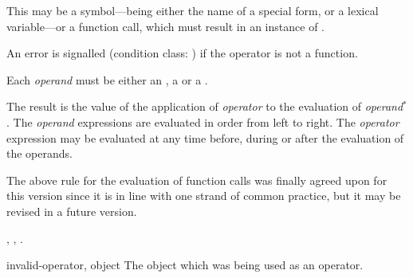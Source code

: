 \begin{optDefinition}
%
\Syntax
{}%
%
\begin{arguments}
    \item[\scref{operator}] This may be a symbol---being either the name of a
    special form, or a lexical variable---or a function call, which must result
    in an instance of .

    An error is signalled (condition class: 
    ) if the operator is not a function.

    \item[\scseqref{operand}] Each {\em operand} must be either an
    , a  or a
    .
\end{arguments}
%
\result%
The result is the value of the application of {\em operator} to the
evaluation of {\em operand\/$^*$}.
%
\remarks%
The {\em operand} expressions are evaluated in order from left to
right.  The {\em operator} expression may be evaluated at any time
before, during or after the evaluation of the operands.
%
\begin{note}
    The above rule for the evaluation of function calls was finally agreed upon
    for this version since it is in line with one strand of common practice, but
    it may be revised in a future version.
\end{note}
%
\seealso%
, , .

%
\begin{initoptions}
    \item[invalid-operator, object] The object which was being used as an
    operator.


\end{initoptions}
\end{optDefinition}
